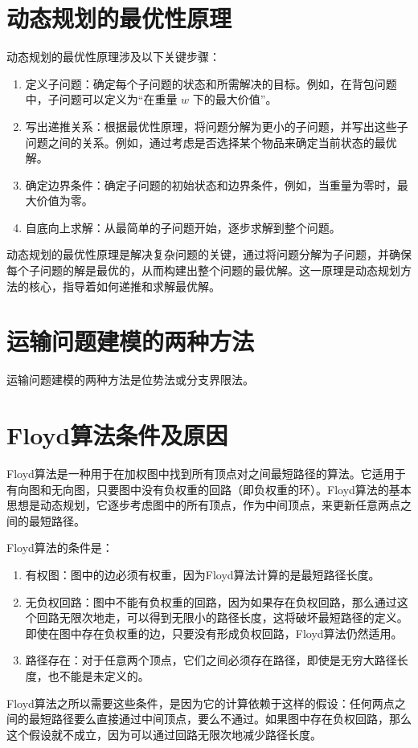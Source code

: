 \documentclass[12pt, a4paper, oneside]{ctexart}
\begin{document}
\section{动态规划的最优性原理}
动态规划的最优性原理涉及以下关键步骤：

\begin{enumerate}[(1)]
  \item 定义子问题：确定每个子问题的状态和所需解决的目标。例如，在背包问题中，子问题可以定义为“在重量 \( w \) 下的最大价值”。
  \item 写出递推关系：根据最优性原理，将问题分解为更小的子问题，并写出这些子问题之间的关系。例如，通过考虑是否选择某个物品来确定当前状态的最优解。
  \item 确定边界条件：确定子问题的初始状态和边界条件，例如，当重量为零时，最大价值为零。
  \item 自底向上求解：从最简单的子问题开始，逐步求解到整个问题。
\end{enumerate}
动态规划的最优性原理是解决复杂问题的关键，通过将问题分解为子问题，并确保每个子问题的解是最优的，从而构建出整个问题的最优解。这一原理是动态规划方法的核心，指导着如何递推和求解最优解。

\section{运输问题建模的两种方法}
运输问题建模的两种方法是位势法或分支界限法。

\section{Floyd算法条件及原因}
Floyd算法是一种用于在加权图中找到所有顶点对之间最短路径的算法。它适用于有向图和无向图，只要图中没有负权重的回路（即负权重的环）。Floyd算法的基本思想是动态规划，它逐步考虑图中的所有顶点，作为中间顶点，来更新任意两点之间的最短路径。

Floyd算法的条件是：

\begin{enumerate}[(1)]
  \item 有权图：图中的边必须有权重，因为Floyd算法计算的是最短路径长度。
  \item 无负权回路：图中不能有负权重的回路，因为如果存在负权回路，那么通过这个回路无限次地走，可以得到无限小的路径长度，这将破坏最短路径的定义。即使在图中存在负权重的边，只要没有形成负权回路，Floyd算法仍然适用。
  \item 路径存在：对于任意两个顶点，它们之间必须存在路径，即使是无穷大路径长度，也不能是未定义的。
\end{enumerate}
Floyd算法之所以需要这些条件，是因为它的计算依赖于这样的假设：任何两点之间的最短路径要么直接通过中间顶点，要么不通过。如果图中存在负权回路，那么这个假设就不成立，因为可以通过回路无限次地减少路径长度。
\end{document}
